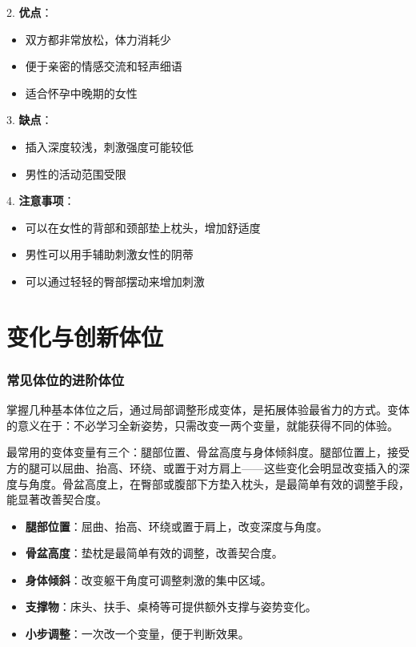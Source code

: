 \documentclass[12pt,UTF8]{ctexbook}
\newcommand{\keyword}[1]{\textbf{#1}}
\begin{document}
2. \textbf{优点}：
  \begin{itemize}
  \item 双方都非常放松，体力消耗少
  \item 便于亲密的情感交流和轻声细语
  \item 适合怀孕中晚期的女性
  \end{itemize}

3. \textbf{缺点}：
  \begin{itemize}
  \item 插入深度较浅，刺激强度可能较低
  \item 男性的活动范围受限
  \end{itemize}

4. \textbf{注意事项}：
  \begin{itemize}
  \item 可以在女性的背部和颈部垫上枕头，增加舒适度
  \item 男性可以用手辅助刺激女性的阴蒂
  \item 可以通过轻轻的臀部摆动来增加刺激
  \end{itemize}

\chapter{变化与创新体位}

\subsection{常见体位的进阶体位}

掌握几种基本体位之后，通过局部调整形成变体，是拓展体验最省力的方式。变体的意义在于：不必学习全新姿势，只需改变一两个变量，就能获得不同的体验。

最常用的变体变量有三个：腿部位置、骨盆高度与身体倾斜度。腿部位置上，接受方的腿可以屈曲、抬高、环绕、或置于对方肩上——这些变化会明显改变插入的深度与角度。骨盆高度上，在臀部或腹部下方垫入枕头，是最简单有效的调整手段，能显著改善契合度。

\begin{itemize}
  \item \keyword{腿部位置}：屈曲、抬高、环绕或置于肩上，改变深度与角度。
  \item \keyword{骨盆高度}：垫枕是最简单有效的调整，改善契合度。
  \item \keyword{身体倾斜}：改变躯干角度可调整刺激的集中区域。
  \item \keyword{支撑物}：床头、扶手、桌椅等可提供额外支撑与姿势变化。
  \item \keyword{小步调整}：一次改一个变量，便于判断效果。
\end{itemize}
\end{document}
